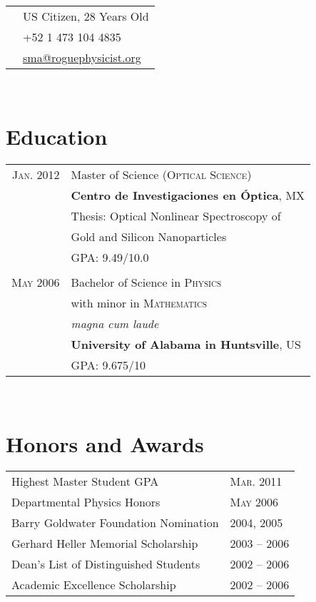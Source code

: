 \documentclass[letterpaper,10pt]{article}
\begin{document}
\begin{minipage}[t]{0.44\textwidth} %
	
	\vspace{0pt} %
	
\colorbox{shade}{\sffamily
\begin{tabular}{c|p{7cm}}
							& US Citizen, 28 Years Old\\
\raisebox{-3pt}{\Phone}		&+52 1 473 104 4835\\
\raisebox{-3pt}{\Envelope}	&\href{mailto:sma@roguephysicist.org}{sma@roguephysicist.org}
\end{tabular}}\\

\section{Education}
	\begin{tabular}{rl}
		\textsc{Jan.} 2012	&	Master of Science \textsc{(Optical Science)}\\
							&	\textbf{Centro de Investigaciones en Óptica}, MX\\
							&	Thesis: Optical Nonlinear Spectroscopy of\\
							&	\hspace{31pt}Gold and Silicon Nanoparticles\\
							&	\normalsize GPA: 9.49/10.0\\
							&	\\
	\textsc{May} 2006	&	Bachelor of Science in \textsc{Physics}\\
							&	with minor in \textsc{Mathematics}\\
							&	\small\emph{magna cum laude}\\
							&	\textbf{University of Alabama in Huntsville}, US\\
							&	\normalsize GPA: 9.675/10
	\end{tabular}\\

\section{Honors and Awards}
	\begin{tabular}{l l}
		Highest Master Student GPA					&	\textsc{Mar.} 2011\\
		Departmental Physics Honors					&	\textsc{May} 2006\\
		Barry Goldwater Foundation Nomination		&	2004, 2005\\
		Gerhard Heller Memorial Scholarship			&	2003 -- 2006\\
		Dean's List of Distinguished Students		&	2002 -- 2006\\
		Academic Excellence Scholarship				&	2002 -- 2006    
	\end{tabular}\\


\end{minipage}
\end{document}
